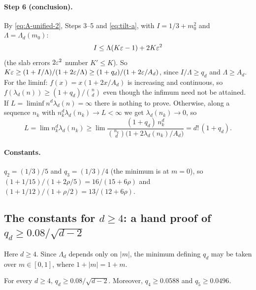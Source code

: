 \documentclass[11pt]{article}
\begin{document}
\paragraph{Step 6 (conclusion).} By \eqref{eq:A-unified-2}, Steps 3--5 and \eqref{eq:tilt-a}, with
$I = 1/3 + m_0^2$ and $\Lambda = \Lambda_d(m_0)$:
\begin{equation*}
  I \le \Lambda(K\varepsilon - 1) + 2K\varepsilon^2
\end{equation*}
(the slab errors $2\varepsilon^2$ number $K' \le K$). So $K\varepsilon \ge (1 + I/\Lambda)/(1 + 2\varepsilon/\Lambda) \ge (1 + q_d)/(1 + 2\varepsilon/A_d)$, since
$I/\Lambda \ge q_d$ and $\Lambda \ge A_d$. For the liminf: $f(x) = x(1 + 2x/A_d)$ is increasing
and continuous, so $f(\lambda_d(n)) \ge (1 + q_d)/\binom{n}{d}$ even though the infimum need not be
attained. If $L = \liminf n^d \lambda_d(n) = \infty$ there is nothing to prove. Otherwise, along a
sequence $n_k$ with $n_k^d \lambda_d(n_k) \to L < \infty$ we get $\lambda_d(n_k) \to 0$, so
\begin{equation*}
  L = \lim n_k^d \lambda_d(n_k)
    \ge \lim \frac{(1 + q_d)\, n_k^d}{\binom{n_k}{d}\bigl(1 + 2\lambda_d(n_k)/A_d\bigr)}
    = d!\,(1 + q_d). \tag*{\qedsymbol}
\end{equation*}

\paragraph{Constants.} $q_2 = (1/3)/5$ and $q_3 = (1/3)/4$ (the minimum is at $m = 0$), so
$(1 + 1/15)/(1 + 2\rho/5) = 16/(15 + 6\rho)$ and $(1 + 1/12)/(1 + \rho/2) = 13/(12 + 6\rho)$.

\subsection{\texorpdfstring{The constants for $d \ge 4$: a hand proof of $q_d \ge 0.08/\sqrt{d-2}$}%
{The constants for d >= 4: a hand proof of q\_d >= 0.08/sqrt(d-2)}}
\label{sec:A-qd}

Here $d \ge 4$. Since $\Lambda_d$ depends only on $|m|$, the minimum defining $q_d$ may be taken over
$m \in [0, 1]$, where $1 + |m| = 1 + m$.

\begin{proposition}\label{prop:A-qd}
For every $d \ge 4$, $q_d \ge 0.08/\sqrt{d-2}$. Moreover, $q_4 \ge 0.0588$ and $q_5 \ge 0.0496$.
\end{proposition}
\end{document}
